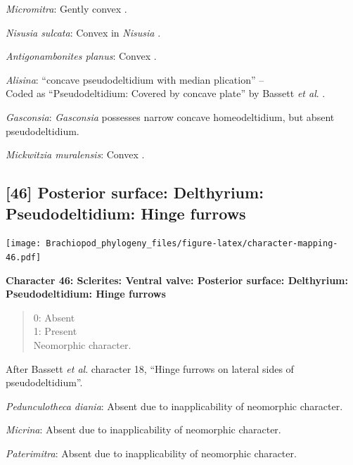 \documentclass[openany]{book}
\theoremstyle{definition}
\theoremstyle{definition}
\theoremstyle{definition}
\theoremstyle{remark}
\begin{document}
\emph{Micromitra}: Gently convex \citep[see][fig.
83.3]{Williams2000BrachiopodaLinguliformea}.

\emph{Nisusia sulcata}: Convex in \emph{Nisusia} \citep[see][fig.
8.4]{Rowell1985Theevolutionary}.

\emph{Antigonambonites planus}: Convex \citep[fig.
508]{Williams2000BrachiopodaLinguliformea}.

\emph{Alisina}: ``concave pseudodeltidium with median plication'' --
\citet{Williams2000BrachiopodaLinguliformea}\\
Coded as ``Pseudodeltidium: Covered by concave plate'' by Bassett
\emph{et al}. \citeyearpar{Bassett2001Functionalmorphology}.

\emph{Gasconsia}: \emph{Gasconsia} possesses narrow concave
homeodeltidium, but absent pseudodeltidium.

\emph{Mickwitzia muralensis}: Convex \citep[see][fig.
4B]{Balthasar2004Shellstructure}.

\hypertarget{posterior-surface-delthyrium-pseudodeltidium-hinge-furrows}{%
\subsection*{{[}46{]} Posterior surface: Delthyrium: Pseudodeltidium:
Hinge
furrows}\label{posterior-surface-delthyrium-pseudodeltidium-hinge-furrows}}

\texttt{[image: Brachiopod\_phylogeny\_files/figure-latex/character-mapping-46.pdf]}

\textbf{Character 46: Sclerites: Ventral valve: Posterior surface:
Delthyrium: Pseudodeltidium: Hinge furrows}

\begin{quote}
0: Absent\\
1: Present\\
Neomorphic character.
\end{quote}

After Bassett \emph{et al}.
\citeyearpar{Bassett2001Functionalmorphology} character 18, ``Hinge
furrows on lateral sides of pseudodeltidium''.

\emph{Pedunculotheca diania}: Absent due to inapplicability of
neomorphic character.

\emph{Micrina}: Absent due to inapplicability of neomorphic character.

\emph{Paterimitra}: Absent due to inapplicability of neomorphic
character.
\end{document}
